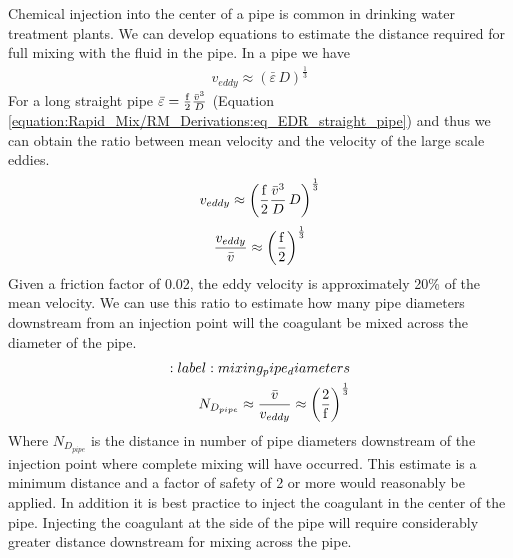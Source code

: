 \documentclass[letterpaper,10pt,english]{sphinxmanual}
\begin{document}
Chemical injection into the center of a pipe is common in drinking water treatment plants. We can develop equations to estimate the distance required for full mixing with the fluid in the pipe. In a pipe we have
\begin{equation}\label{equation:Rapid_Mix/RM_Derivations:Rapid_Mix/RM_Derivations:39}
\begin{split}v_{eddy} \approx \left( \bar\varepsilon \, D \right)^\frac{1}{3}\end{split}
\end{equation}
For a long straight pipe
\(\bar\varepsilon = \frac{{\rm f}}{2} \frac{\bar v^3}{D}\) (Equation \eqref{equation:Rapid_Mix/RM_Derivations:eq_EDR_straight_pipe}) and thus we can obtain the ratio between mean velocity and the velocity of the large scale eddies.
\begin{equation}\label{equation:Rapid_Mix/RM_Derivations:Rapid_Mix/RM_Derivations:40}
\begin{split}v_{eddy} \approx \left( \frac{{\rm f}}{2} \frac{\bar v^3}{D} \, D \right)^\frac{1}{3}\end{split}
\end{equation}\begin{equation}\label{equation:Rapid_Mix/RM_Derivations:Rapid_Mix/RM_Derivations:41}
\begin{split}\frac{v_{eddy}}{\bar v} \approx \left( \frac{{\rm f}}{2}   \right)^\frac{1}{3}\end{split}
\end{equation}
Given a friction factor of 0.02, the eddy velocity is approximately 20\% of the mean velocity. We can use this ratio to estimate how many pipe diameters downstream from an injection point will the coagulant be mixed across the diameter of the pipe.
\begin{align}\label{equation:Rapid_Mix/RM_Derivations:Rapid_Mix/RM_Derivations:42}\!\begin{aligned}
:label: mixing_pipe_diameters\\
N_{D_{pipe}} \approx \frac{\bar v}{v_{eddy}} \approx \left(\frac{2}{{\rm f}} \right)^\frac{1}{3}\\
\end{aligned}\end{align}
Where \(N_{D_{pipe}}\) is the distance in number of pipe diameters downstream of the injection point where complete mixing will have occurred. This estimate is a minimum distance and a factor of safety of 2 or more would reasonably be applied. In addition it is best practice to inject the coagulant in the center of the pipe. Injecting the coagulant at the side of the pipe will require considerably greater distance downstream for mixing across the pipe.
\end{document}
